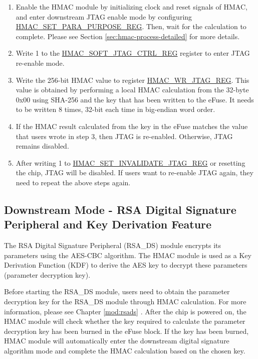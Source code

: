 \documentclass[main\_\_EN.tex]{subfiles}
\begin{document}
\begin{enumerate}
\item Enable the HMAC module by initializing clock and reset signals of HMAC, and enter downstream JTAG enable mode by configuring \hyperref[regdesc:HMACSETPARAPURPOSEREG]{HMAC\_SET\_PARA\_PURPOSE\_REG}. Then, wait for the calculation to complete. Please see Section \ref{sec:hmac-process-detailed} for more details.
\item Write 1 to the \hyperref[regdesc:HMACSOFTJTAGCTRLREG]{HMAC\_SOFT\_JTAG\_CTRL\_REG} register to enter JTAG re-enable mode.
\item Write the 256-bit HMAC value to register \hyperref[regdesc:HMACWRJTAGREG]{HMAC\_WR\_JTAG\_REG}. This value is obtained by performing a local HMAC calculation from the 32-byte 0x00 using SHA-256 and the key that has been written to the eFuse. It needs to be written 8 times, 32-bit each time in big-endian word order.
\item If the HMAC result calculated from the key in the eFuse matches the value that users wrote in step 3, then JTAG is re-enabled. Otherwise, JTAG remains disabled.
\item After writing 1 to \hyperref[regdesc:HMACSETINVALIDATEJTAGREG]{HMAC\_SET\_INVALIDATE\_JTAG\_REG} or resetting the chip, JTAG will be disabled. If users want to re-enable JTAG again, they need to repeat the above steps again.
\end{enumerate}

\subsection{Downstream Mode - RSA Digital Signature Peripheral and Key Derivation Feature}

The RSA Digital Signature Peripheral (RSA\_DS) module encrypts its parameters using the AES-CBC algorithm. The HMAC module is used as a Key Derivation Function (KDF) to derive the AES key to decrypt these parameters (parameter decryption key).

Before starting the RSA\_DS module, users need to obtain the parameter decryption key for the RSA\_DS module through HMAC calculation. For more information, please see Chapter \ref{mod:rsads} \textit{}. After the chip is powered on, the HMAC module will check whether the key required to calculate the parameter decryption key has been burned in the eFuse block. If the key has been burned, HMAC module will automatically enter the downstream digital signature algorithm mode and complete the HMAC calculation based on the chosen key.
\end{document}
